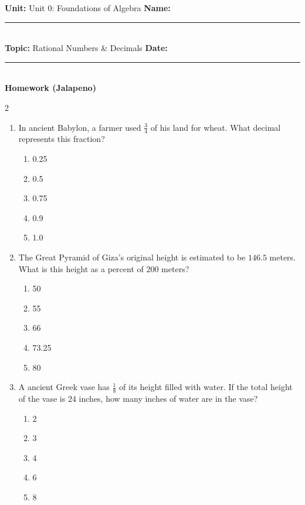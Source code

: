 \documentclass[10pt]{article}
\begin{document}
\enlargethispage{2.5cm}

\begin{tcolorbox}[colback=mainblue!5, colframe=mainblue, sharp corners, boxrule=0.5pt]
    \small \textbf{Unit:} Unit 0: Foundations of Algebra \hfill \textbf{Name:} \rule{3cm}{0.4pt} \\
    \small \textbf{Topic:} Rational Numbers & Decimals \hfill \textbf{Date:} \rule{2cm}{0.4pt} \\
    \centering \textbf{\large Homework (Jalapeno)}
\end{tcolorbox}

\vspace{0.2cm}

\begin{multicols}{2}
\begin{enumerate}[label=\textbf{Q\arabic*.}, leftmargin=*, itemsep=6pt, parsep=0pt]

  \item \small In ancient Babylon, a farmer used $\frac{3}{4}$ of his land for wheat. What decimal represents this fraction?
  \begin{enumerate}[label=(\Alph*), leftmargin=0.6cm, nosep, itemsep=2pt]
    \item 0.25
    \item 0.5
    \item 0.75
    \item 0.9
    \item 1.0
  \end{enumerate}

  \item \small The Great Pyramid of Giza's original height is estimated to be $146.5$ meters. What is this height as a percent of $200$ meters?
  \begin{enumerate}[label=(\Alph*), leftmargin=0.6cm, nosep, itemsep=2pt]
    \item 50%
    \item 55%
    \item 66%
    \item 73.25%
    \item 80%
  \end{enumerate}

  \item \small A ancient Greek vase has $\frac{1}{8}$ of its height filled with water. If the total height of the vase is $24$ inches, how many inches of water are in the vase?
  \begin{enumerate}[label=(\Alph*), leftmargin=0.6cm, nosep, itemsep=2pt]
    \item 2
    \item 3
    \item 4
    \item 6
    \item 8
  \end{enumerate}


\end{enumerate}
\end{multicols}
\end{document}
